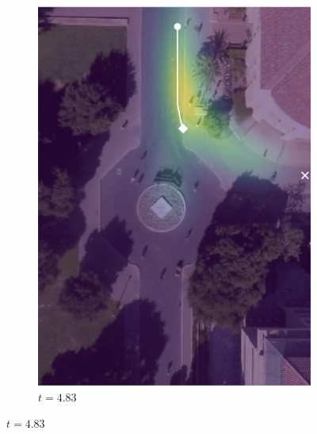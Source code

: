 \documentclass[letterpaper,10pt,conference]{ieeeconf}
\begin{document}
\begin{figure}
\begin{subfigure}[b]{.45\linewidth}
			\includegraphics[width=\linewidth]{./figures/FirstPage/gates_1_2_t=145.jpg}
			\caption{$t=4.83$}
		\end{subfigure}
	

\end{figure}
\end{document}
